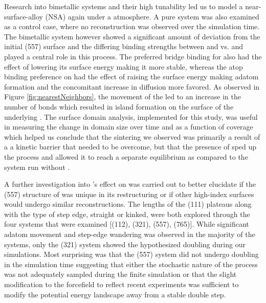 Research into bimetallic systems and their high tunability led us to model a
 near-surface-alloy (NSA) again under a  atmosphere. A
pure  system was also examined as a control case, where no
reconstruction was observed over the simulation time. The bimetallic system
however showed a significant amount of deviation from the initial (557) surface
and the differing binding strengths between  and  vs.  and
 played a central role in this process. The preferred bridge binding for
 also had the effect of lowering its surface energy making it
more stable, whereas the atop binding preference on  had the effect of
raising the surface energy making adatom formation and the concomitant increase
in diffusion more favored. As observed in Figure \ref{fig:nearestNeighbors},
the movement of the  led to an increase in the number of
 bonds which resulted in island formation on the surface of
the underlying . The surface domain analysis, implemented for this
study, was useful in measuring the change in domain size over time and as a
function of  coverage which helped us conclude that the sintering we
observed was primarily a result of a a kinetic barrier that needed to be
overcome, but that the presence of  sped up the process and allowed it
to reach a separate equilibrium as compared to the system run without .

A further investigation into 's effect on  was carried out to
better elucidate if the (557) structure of  was unique in its
restructuring or if other high-index surfaces would undergo similar
reconstructions. The lengths of the (111) plateaus along with the type of step
edge, straight or kinked, were both explored through the four systems that were
examined [(112), (321), (557), (765)]. While significant adatom movement and
step-edge wandering was observed in the majority of the systems, only the (321)
system showed the hypothesized doubling during our simulations. Most surprising
was that the (557) system did not undergo doubling in the simulation time
suggesting that either the stochastic nature of the process was not adequately
sampled during the finite simulation or that the slight modification to the
 forcefield to reflect recent
experiments\citep{Deshlahra:2012aa} was sufficient to modify the potential
energy landscape away from a stable double step.

